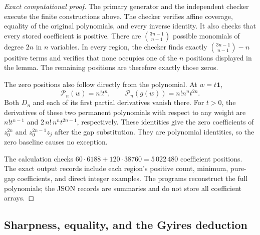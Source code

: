 \documentclass[11pt,a4paper]{article}
\theoremstyle{definition}
\theoremstyle{remark}
\begin{document}
\begin{proof}[Exact computational proof]
The primary generator and the independent checker execute the finite
constructions above. The checker verifies affine coverage, equality of
the original polynomials, and every inverse identity.
It also checks that every stored coefficient is positive.
There are $\binom{3n-1}{n-1}$ possible monomials of degree $2n$ in $n$
variables. In every region, the checker finds exactly
$\binom{3n-1}{n-1}-n$ positive terms and verifies that none occupies one
of the $n$ positions displayed in the lemma. The remaining positions
are therefore exactly those zeros.

The zero positions also follow directly from the polynomial.
At $w=t\mathbf1$,
\[
 \mathcal P_n(w)=n!t^n,\qquad
 \mathcal P_n(g(w))=n!n^nt^{2n}.
\]
Both $D_n$ and each of its first partial derivatives vanish there.
For $t>0$, the derivatives of these two permanent polynomials with
respect to any weight are $n!t^{n-1}$ and
$2\,n!\,n^nt^{2n-1}$, respectively.
These identities give the zero coefficients of $z_0^{2n}$ and
$z_0^{2n-1}z_j$ after the gap substitution.
They are polynomial identities, so the zero baseline causes no exception.

The calculation checks $60\cdot6188+120\cdot38760
=5\,022\,480$ coefficient positions.
The exact output records include each region's positive count, minimum,
pure-gap coefficients, and direct integer examples.
The programs reconstruct the full polynomials; the JSON records are
summaries and do not store all coefficient arrays.
\end{proof}

\subsection{Sharpness, equality, and the Gyires deduction}
\end{document}
